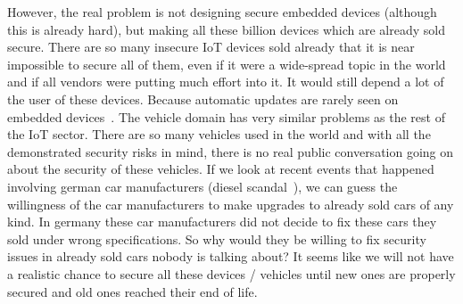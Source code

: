 However, the real problem is not designing secure embedded devices (although
this is already hard), but making all these billion devices which are already
sold secure. There are so many insecure IoT devices sold already that it is near
impossible to secure all of them, even if it were a wide-spread topic in the
world and if all vendors were putting much effort into it. It would still depend
a lot of the user of these devices. Because automatic updates are rarely seen on
embedded devices~\cite{Viega2012}. The vehicle domain has very similar problems as the
rest of the IoT sector. There are so many vehicles used in the world and with
all the demonstrated security risks in mind, there is no real public
conversation going on about the security of these vehicles. If we look at recent
events that happened involving german car manufacturers (diesel
scandal~\cite{spiegel17}), we can guess the willingness of the car manufacturers
to make upgrades to already sold cars of any kind. In germany these car
manufacturers did not decide to fix these cars they sold under wrong
specifications. So why would they be willing to fix security issues in already
sold cars nobody is talking about? It seems like we will not have a realistic
chance to secure all these devices / vehicles until new ones are properly
secured and old ones reached their end of life.


